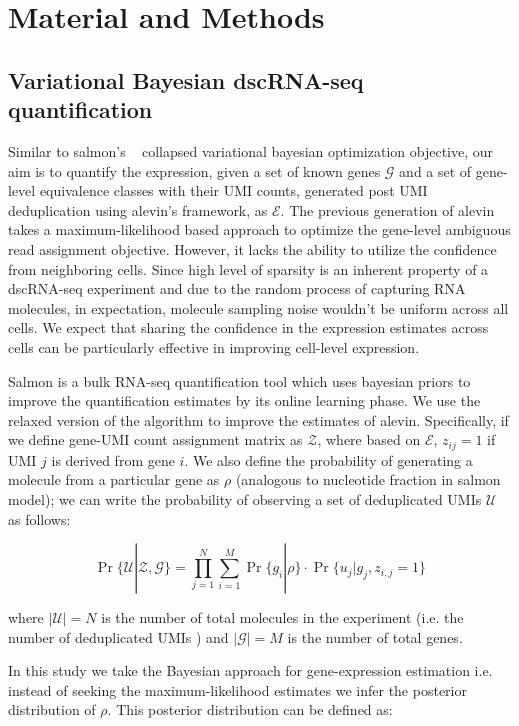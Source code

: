 \section{Material and Methods}
\label{sec:alv2_methods}

\subsection{Variational Bayesian dscRNA-seq quantification}
Similar to salmon's ~\citep{salmon} collapsed variational bayesian optimization 
objective, our aim is to quantify the expression, given a set of known genes $\mathcal{G}$ and a set
of gene-level equivalence classes with their UMI counts, generated post UMI deduplication using alevin's 
framework, as $\mathcal{E}$. The previous generation of alevin takes a maximum-likelihood based approach to 
optimize the gene-level ambiguous read assignment objective. However, it lacks the ability to utilize the 
confidence from neighboring cells. Since high level of sparsity is an inherent property of a dscRNA-seq
experiment and due to the random process of capturing RNA molecules, in expectation, molecule 
sampling noise wouldn't be uniform across all cells. We expect that sharing the confidence in 
the expression estimates across cells can be particularly effective in improving cell-level expression. 

Salmon is a bulk RNA-seq quantification tool which uses bayesian priors to improve the 
quantification estimates by its online learning phase. We use the relaxed version of the algorithm 
to improve the estimates of alevin. Specifically, if we define gene-UMI count 
assignment matrix as $\mathcal{Z}$, where based on $\mathcal{E}$, $z_{ij}=1$ if UMI $j$ is derived from 
gene $i$. We also define the probability of generating a molecule from a particular gene as $\rho$ (analogous to 
nucleotide fraction in salmon model); we can write the probability of observing a set of deduplicated 
UMIs $\mathcal{U}$ as follows:

\begin{equation}
	\Pr\{\mathcal{U} | \mathcal{Z},\mathcal{G}\} = 
	\prod_{j=1}^{N}\sum_{i=1}^{M}\Pr\{ g_i | \rho \} \cdot \Pr\{ u_j | g_j, z_{i,j} = 1 \}
\end{equation}
 
 where $|\mathcal{U}| = N$ is the number of total molecules in the experiment (i.e. the number of 
 deduplicated UMIs ) and $|\mathcal{G}| = M$ is the number of total genes.
 
In this study we take the Bayesian approach for gene-expression estimation i.e. instead of 
seeking the maximum-likelihood estimates we infer the posterior distribution of $\rho$. 
This posterior distribution can be defined as:

